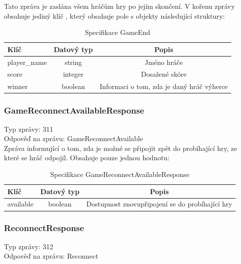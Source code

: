 \documentclass[12pt, a4paper]{article}
\begin{document}
    Tato zpráva je zaslána všem hráčům hry po jejím skončení.
    V kořenu zprávy obsahuje jediný klíč , který obsahuje pole s objekty následující struktury:

    \begin{table}[H]
        \centering
        \begin{tabular}{|l|c|c|}
            \hline
            Klíč & Datový typ & Popis\\
            \hline
            \hline
            player\_name & string & Jméno hráče\\
            \hline
            score & integer & Dosažené skóre\\
            \hline
            winner & boolean & Informaci o tom, zda je daný hráč výherce\\
            \hline
        \end{tabular}
        \caption{Specifikace GameEnd}
    \end{table}

    \subsubsection*{GameReconnectAvailableResponse}
    Typ zprávy: 311\\
    Odpověď na zprávu: GameReconnectAvailable\\

    Zpráva informující o tom, zda je možné se připojit zpět do probíhající hry, ze které se hráč odpojil. Obsahuje pouze jednou hodnotu:

    \begin{table}[H]
        \centering
        \begin{tabular}{|l|c|c|}
            \hline
            Klíč & Datový typ & Popis\\
            \hline
            \hline
            available & boolean & Dostupnost znovupřipojení se do probíhající hry\\
            \hline
        \end{tabular}
        \caption{Specifikace GameReconnectAvailableResponse}
    \end{table}

    \subsubsection*{ReconnectResponse}
    Typ zprávy: 312\\
    Odpověď na zprávu: Reconnect\\
\end{document}
